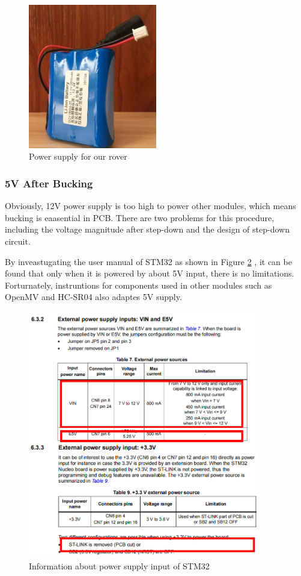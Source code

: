 \documentclass[12pt, a4paper, oneside]{report}
\begin{document}
\begin{figure}[H]
  \centering
  \includegraphics[width=0.5\textwidth]{pic/Motor Drive/19.jpg}
  \caption{Power supply for our rover}
  \label{fig:mt9}
\end{figure}

\subsubsection{5V After Bucking}
Obviously, 12V power supply is too high to power other modules, which means bucking is eaasential in PCB. There are two problems for this procedure, including the voltage magnitude after step-down and the design of step-down circuit.

By inveastugating the user manual of STM32 as shown in Figure \ref{fig:mt10} , it can be found that only when it is powered by about 5V input, there is no limitations. Forturnately, instruntions for components used in other modules such as OpenMV and HC-SR04 also adaptes 5V supply.

\begin{figure}[H]
  \centering
  \includegraphics[width=0.9\textwidth]{pic/Motor Drive/20.png}
  \caption{Information about power supply input of STM32 \cite{zzs3}}
  \label{fig:mt10}
\end{figure}
\end{document}
